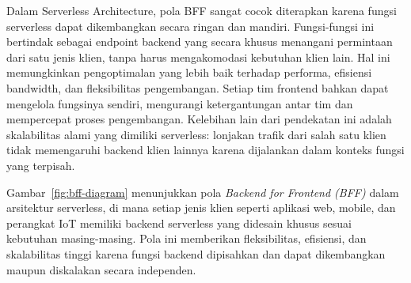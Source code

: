Dalam Serverless Architecture, pola BFF sangat cocok diterapkan karena fungsi serverless dapat dikembangkan secara ringan dan mandiri. Fungsi-fungsi ini bertindak sebagai endpoint backend yang secara khusus menangani permintaan dari satu jenis klien, tanpa harus mengakomodasi kebutuhan klien lain. Hal ini memungkinkan pengoptimalan yang lebih baik terhadap performa, efisiensi bandwidth, dan fleksibilitas pengembangan. Setiap tim frontend bahkan dapat mengelola fungsinya sendiri, mengurangi ketergantungan antar tim dan mempercepat proses pengembangan. Kelebihan lain dari pendekatan ini adalah skalabilitas alami yang dimiliki serverless: lonjakan trafik dari salah satu klien tidak memengaruhi backend klien lainnya karena dijalankan dalam konteks fungsi yang terpisah.

Gambar~\ref{fig:bff-diagram} menunjukkan pola \textit{Backend for Frontend (BFF)} dalam arsitektur serverless, di mana setiap jenis klien seperti aplikasi web, mobile, dan perangkat IoT memiliki backend serverless yang didesain khusus sesuai kebutuhan masing-masing. Pola ini memberikan fleksibilitas, efisiensi, dan skalabilitas tinggi karena fungsi backend dipisahkan dan dapat dikembangkan maupun diskalakan secara independen.

